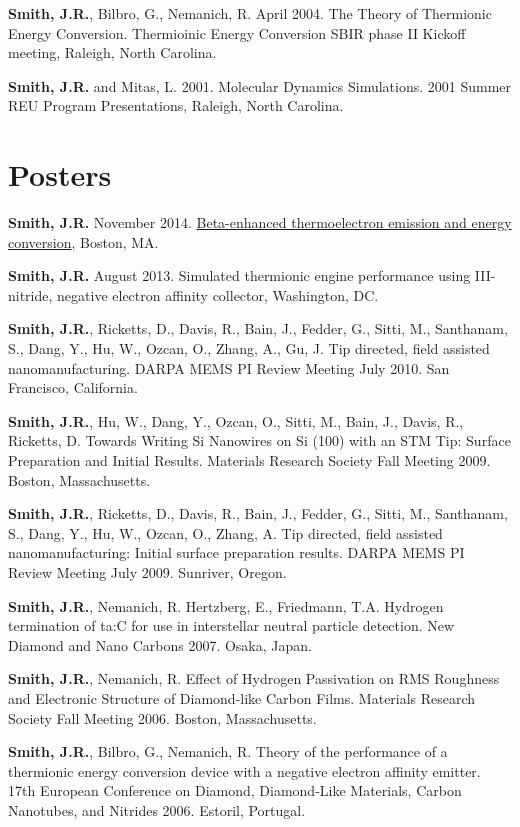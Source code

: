 \textbf{Smith, J.R.}, Bilbro, G., Nemanich, R. April 2004. The Theory of
Thermionic Energy Conversion. Thermioinic Energy Conversion SBIR phase
II Kickoff meeting, Raleigh, North Carolina.

\textbf{Smith, J.R.} and Mitas, L. 2001. Molecular Dynamics Simulations.
2001 Summer REU Program Presentations, Raleigh, North Carolina.

\section{Posters}

\textbf{Smith, J.R.} November 2014.
\href{https://github.com/jrsmith3/conf-mrs_fall_2014_poster/releases}{Beta-enhanced
thermoelectron emission and energy conversion}, Boston, MA.

\textbf{Smith, J.R.} August 2013. Simulated thermionic engine
performance using III-nitride, negative electron affinity collector,
Washington, DC.

\textbf{Smith, J.R.}, Ricketts, D., Davis, R., Bain, J., Fedder, G.,
Sitti, M., Santhanam, S., Dang, Y., Hu, W., Ozcan, O., Zhang, A., Gu, J.
Tip directed, field assisted nanomanufacturing. DARPA MEMS PI Review
Meeting July 2010. San Francisco, California.

\textbf{Smith, J.R.}, Hu, W., Dang, Y., Ozcan, O., Sitti, M., Bain, J.,
Davis, R., Ricketts, D. Towards Writing Si Nanowires on Si (100) with an
STM Tip: Surface Preparation and Initial Results. Materials Research
Society Fall Meeting 2009. Boston, Massachusetts.

\textbf{Smith, J.R.}, Ricketts, D., Davis, R., Bain, J., Fedder, G.,
Sitti, M., Santhanam, S., Dang, Y., Hu, W., Ozcan, O., Zhang, A. Tip
directed, field assisted nanomanufacturing: Initial surface preparation
results. DARPA MEMS PI Review Meeting July 2009. Sunriver, Oregon.

\textbf{Smith, J.R.}, Nemanich, R. Hertzberg, E., Friedmann, T.A.
Hydrogen termination of ta:C for use in interstellar neutral particle
detection. New Diamond and Nano Carbons 2007. Osaka, Japan.

\textbf{Smith, J.R.}, Nemanich, R. Effect of Hydrogen Passivation on RMS
Roughness and Electronic Structure of Diamond-like Carbon Films.
Materials Research Society Fall Meeting 2006. Boston, Massachusetts.

\textbf{Smith, J.R.}, Bilbro, G., Nemanich, R. Theory of the performance
of a thermionic energy conversion device with a negative electron
affinity emitter. 17th European Conference on Diamond, Diamond-Like
Materials, Carbon Nanotubes, and Nitrides 2006. Estoril, Portugal.

